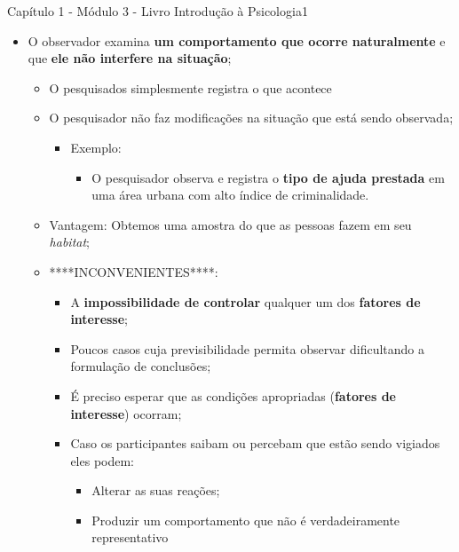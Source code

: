 \documentclass[
]{book}
\providecommand{\tightlist}{%
  \setlength{\itemsep}{0pt}\setlength{\parskip}{0pt}}
\begin{document}
Capítulo 1 - Módulo 3 - Livro Introdução à Psicologia1

\begin{itemize}
\tightlist
\item
  O observador examina \textbf{um comportamento que ocorre naturalmente}
  e que \textbf{ele não interfere na situação};

  \begin{itemize}
  \tightlist
  \item
    O pesquisados simplesmente registra o que acontece
  \item
    O pesquisador não faz modificações na situação que está sendo
    observada;

    \begin{itemize}
    \tightlist
    \item
      Exemplo:

      \begin{itemize}
      \tightlist
      \item
        O pesquisador observa e registra o \textbf{tipo de ajuda
        prestada} em uma área urbana com alto índice de criminalidade.
      \end{itemize}
    \end{itemize}
  \item
    Vantagem: Obtemos uma amostra do que as pessoas fazem em seu
    \emph{habitat};
  \item
    ****INCONVENIENTES****:

    \begin{itemize}
    \tightlist
    \item
      A \textbf{impossibilidade de controlar} qualquer um dos
      \textbf{fatores de interesse};
    \item
      Poucos casos cuja previsibilidade permita observar dificultando a
      formulação de conclusões;
    \item
      É preciso esperar que as condições apropriadas (\textbf{fatores de
      interesse}) ocorram;
    \item
      Caso os participantes saibam ou percebam que estão sendo vigiados
      eles podem:

      \begin{itemize}
      \tightlist
      \item
        Alterar as suas reações;
      \item
        Produzir um comportamento que não é verdadeiramente
        representativo
      \end{itemize}
    \end{itemize}
  \end{itemize}
\end{itemize}
\end{document}

